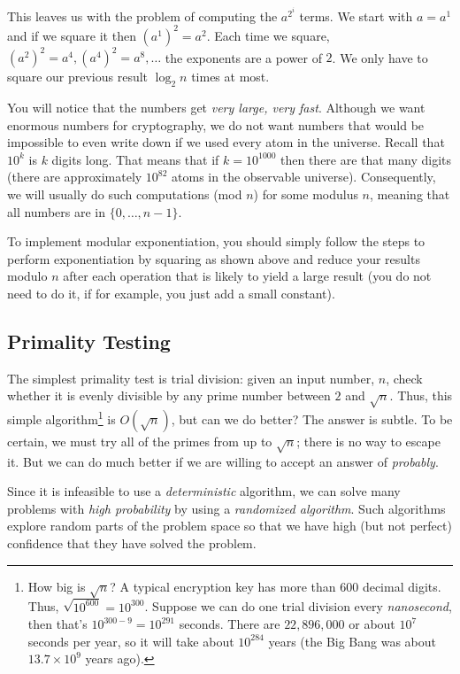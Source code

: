 \documentclass[11pt]{article}
\begin{document}
This leaves us with the problem of computing the $a^{2^i}$ terms. We
start with $a = a^1$ and if we square it then $(a^1)^2 = a^2$. Each
time we square, $(a^2)^2 = a^4, (a^4)^2 = a^8, \ldots$ the exponents
are a power of $2$. We only have to square our previous result $\log_2
n$ times at most.

You will notice that the numbers get \emph{very large, very fast}.
Although we want enormous numbers for cryptography, we do not want
numbers that would be impossible to even write down if we used every
atom in the universe. Recall that $10^k$ is $k$ digits long. That
means that if $k=10^{1000}$ then there are that many digits (there are
approximately $10^{82}$ atoms in the observable universe).
Consequently, we will usually do such computations (mod ${n}$) for
some modulus $n$, meaning that all numbers are in $\{0, \ldots,
n-1\}$.

To implement modular exponentiation, you should simply follow the
steps to perform exponentiation by squaring as shown above and
reduce your results modulo $n$ after each operation that is likely to
yield a large result (you do not need to do it, if for example, you
just add a small constant).

\subsection{Primality Testing}
The simplest primality test is trial division: given an input number,
$n$, check whether it is evenly divisible by any prime number between
$2$ and $\sqrt{n}$. Thus, this simple algorithm\footnote{ How big
is $\sqrt{n}$? A typical encryption key has more than $600$ decimal
digits. Thus, $\sqrt{10^{600}}=10^{300}$.  Suppose we can do one
trial division every \emph{nanosecond}, then that's $10^{300-9} =
10^{291}$ seconds. There are $22,896,000$ or about $10^7$ seconds
per year, so it will take about $10^{284}$ years (the Big Bang was
about $13.7\times 10^{9}$ years ago).  } is $O(\sqrt{n})$, but can
we do better? The answer is subtle. To be certain, we must try all
of the primes from up to $\sqrt{n}$; there is no way to escape it.
But we can do much better if we are willing to accept an answer of
\emph{probably}.

Since it is infeasible to use a \emph{deterministic} algorithm, we
can solve many problems with \emph{high probability} by using a
\emph{randomized algorithm}. Such algorithms explore random parts
of the problem space so that we have high (but not perfect) confidence
that they have solved the problem.
\end{document}
